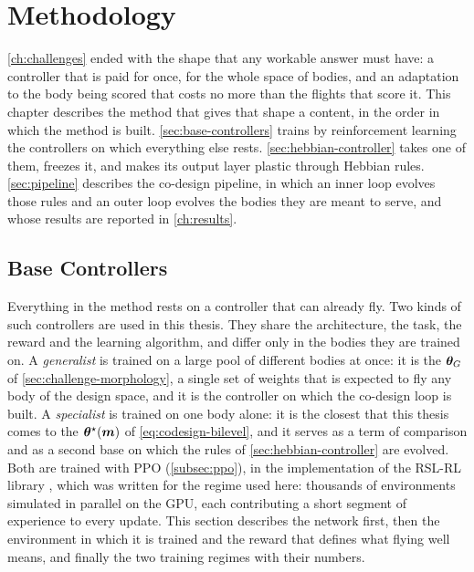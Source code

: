 \chapter{Methodology}
\label{ch:method}

\autoref{ch:challenges} ended with the shape that any workable answer must have: a controller that is paid for once, for the whole space of bodies, and an adaptation to the body being scored that costs no more than the flights that score it. This chapter describes the method that gives that shape a content, in the order in which the method is built. \autoref{sec:base-controllers} trains by reinforcement learning the controllers on which everything else rests. \autoref{sec:hebbian-controller} takes one of them, freezes it, and makes its output layer plastic through Hebbian rules. \autoref{sec:pipeline} describes the co-design pipeline, in which an inner loop evolves those rules and an outer loop evolves the bodies they are meant to serve, and whose results are reported in \autoref{ch:results}.

\section{Base Controllers}
\label{sec:base-controllers}

Everything in the method rests on a controller that can already fly. Two kinds of such controllers are used in this thesis. They share the architecture, the task, the reward and the learning algorithm, and differ only in the bodies they are trained on. A \emph{generalist} is trained on a large pool of different bodies at once: it is the $\bm{\theta}_G$ of \autoref{sec:challenge-morphology}, a single set of weights that is expected to fly any body of the design space, and it is the controller on which the co-design loop is built. A \emph{specialist} is trained on one body alone: it is the closest that this thesis comes to the $\bm{\theta}^{\star}(\bm{m})$ of \eqref{eq:codesign-bilevel}, and it serves as a term of comparison and as a second base on which the rules of \autoref{sec:hebbian-controller} are evolved. Both are trained with PPO (\autoref{subsec:ppo}), in the implementation of the RSL-RL library \cite{rudin2022learning}, which was written for the regime used here: thousands of environments simulated in parallel on the GPU, each contributing a short segment of experience to every update. This section describes the network first, then the environment in which it is trained and the reward that defines what flying well means, and finally the two training regimes with their numbers.

